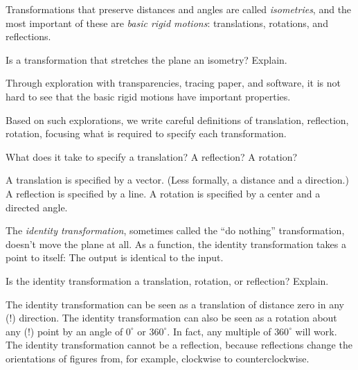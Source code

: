 \begin{definition}
Transformations that preserve distances and angles are called \emph{isometries}, and the most important of these are \emph{basic rigid motions}: translations, rotations, and reflections.  
\end{definition}

\begin{question}
Is a transformation that stretches the plane an isometry?  Explain.  
\end{question}
\QM

Through exploration with transparencies, tracing paper, and software, it is not hard to see that the basic rigid motions have important properties.     

Based on such explorations, we write careful definitions of translation, reflection, rotation, focusing what is required to specify each transformation.

\begin{question}
What does it take to specify a translation?  A reflection?  A rotation?
\end{question}
\QM
\begin{teachingnote}
A translation is specified by a vector.  (Less formally, a distance and a direction.) A reflection is specified by a line. A rotation is specified by a center and a directed angle. 
\end{teachingnote}

\begin{definition}
The \emph{identity transformation}, sometimes called the ``do nothing'' transformation, doesn't move the plane at all.  As a function, the identity transformation takes a point to itself: The output is identical to the input.
\end{definition}

\begin{question}
Is the identity transformation a translation, rotation, or reflection?  Explain.  
\end{question}
\QM 
\begin{teachingnote}
The identity transformation can be seen as a translation of distance zero in any (!) direction.  The identity transformation can also be seen as a rotation about any (!) point by an angle of $0^\circ$ or $360^\circ$.  In fact, any multiple of $360^\circ$ will work.  The identity transformation cannot be a reflection, because reflections change the orientations of figures from, for example, clockwise to counterclockwise. 
\end{teachingnote}

